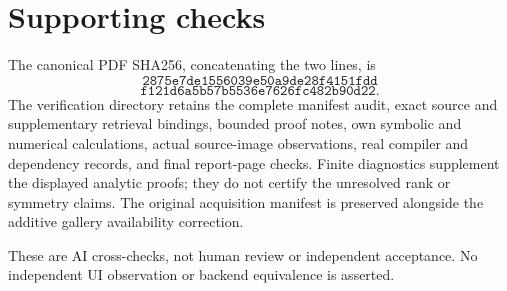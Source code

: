 \documentclass[10pt]{article}
\begin{document}
\section*{Supporting checks}
The canonical PDF SHA256, concatenating the two lines, is \[\texttt{2875e7de1556039e50a9de28f4151fdd}\] \[\texttt{f121d6a5b57b5536e7626fc482b90d22}.\] The verification directory retains the complete manifest audit, exact source and supplementary retrieval bindings, bounded proof notes, own symbolic and numerical calculations, actual source-image observations, real compiler and dependency records, and final report-page checks. Finite diagnostics supplement the displayed analytic proofs; they do not certify the unresolved rank or symmetry claims. The original acquisition manifest is preserved alongside the additive gallery availability correction.\par
These are AI cross-checks, not human review or independent acceptance. No independent UI observation or backend equivalence is asserted.\par
\end{document}
